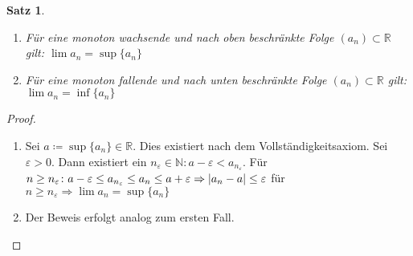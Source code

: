 \documentclass[ngerman,titlepage,twoside, parskip=half*]{scrreprt}
\newcommand*{\N}{\mathbb{N}}
\newcommand*{\R}{\mathbb{R}}
\theoremstyle{break}
\newtheorem{theorem}{Satz}[section]
\theoremstyle{nonumberbreak}
\newtheorem{proof}{Beweis:}
\DeclarePairedDelimiter{\abs}{\lvert}{\rvert}
\begin{document}
\begin{theorem}
  \label{satz:monotoneFolge}
  \begin{enumerate}
  \item Für eine monoton wachsende und nach oben beschränkte Folge
    $(a_n) \subset \R$ gilt: $\lim a_n = \sup \{a_n\}$
  \item Für eine monoton fallende und nach unten beschränkte Folge $(a_n)
    \subset \R$ gilt: $\lim a_n = \inf \{a_n\}$
  \end{enumerate}
\end{theorem}
\begin{proof}
\begin{enumerate}
\item Sei $a \coloneqq \sup \{a_n\} \in \R$. Dies existiert nach dem
  Vollständigkeitsaxiom. Sei $\varepsilon > 0$. Dann existiert ein
  $n_{\varepsilon} \in \N \colon a-\varepsilon < a_{n_{\varepsilon}}$. Für
  $n \geq n_{\varepsilon} \colon a-\varepsilon \leq a_{n_{\varepsilon}}
  \leq a_n \leq a+\varepsilon\Rightarrow \abs{a_n-a} \leq \varepsilon$ für
  $n \geq n_{\varepsilon} \Rightarrow \lim a_n= \sup \{a_n\}$
\item Der Beweis erfolgt analog zum ersten Fall.
\end{enumerate}
\end{proof}
\end{document}
